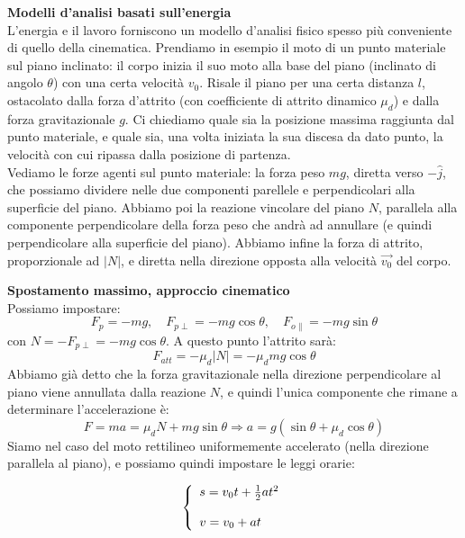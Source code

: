 \documentclass[a4paper,12pt]{article}
\begin{document}
\par\smallskip
\textbf{Modelli d'analisi basati sull'energia} \\
L'energia e il lavoro forniscono un modello d'analisi fisico spesso più conveniente di quello della cinematica.
Prendiamo in esempio il moto di un punto materiale sul piano inclinato: il corpo inizia il suo moto alla base
del piano (inclinato di angolo $\theta$) con una certa velocità $v_0$. Risale il piano per una certa distanza $l$, ostacolato dalla forza d'attrito
(con coefficiente di attrito dinamico $\mu_d$) e dalla forza gravitazionale $g$. Ci chiediamo quale sia la posizione massima
raggiunta dal punto materiale, e quale sia, una volta iniziata la sua discesa da dato punto, la velocità con cui ripassa dalla posizione
di partenza. \\
Vediamo le forze agenti sul punto materiale: la forza peso $mg$, diretta verso $-\hat{j}$, che possiamo dividere nelle due componenti
parellele e perpendicolari alla superficie del piano. Abbiamo poi la reazione vincolare del piano $N$, parallela alla componente
perpendicolare della forza peso che andrà ad annullare (e quindi perpendicolare alla superficie del piano). Abbiamo infine la forza di attrito,
proporzionale ad $|N|$, e diretta nella direzione opposta alla velocità $\vec{v_0}$ del corpo. 

\par\smallskip
\textbf{Spostamento massimo, approccio cinematico} \\
Possiamo impostare:
$$ F_p = -mg, \quad F_{p\perp} = -mg\cos{\theta}, \quad F_{o\parallel} = -mg\sin{\theta} $$
con $N = -F_{p\perp} = -mg\cos{\theta}$. A questo punto l'attrito sarà:
$$ F_{att} = -\mu_d|N| = -\mu_dmg\cos{\theta} $$
Abbiamo già detto che la forza gravitazionale nella direzione perpendicolare al piano viene annullata dalla reazione $N$, e quindi
l'unica componente che rimane a determinare l'accelerazione è:
$$ F = ma = \mu_dN + mg\sin{\theta} \Rightarrow a = g(\sin{\theta} + \mu_d\cos{\theta}) $$
Siamo nel caso del moto rettilineo uniformemente accelerato (nella direzione parallela al piano), e possiamo quindi impostare le leggi
orarie:

$$
\begin{aligned}
\left\{\begin{array}{l}
  s = v_0t + \frac{1}{2}at^2 \cr \\
  v = v_0 + at
\end{array}\right.
\end{aligned}
$$
\end{document}
